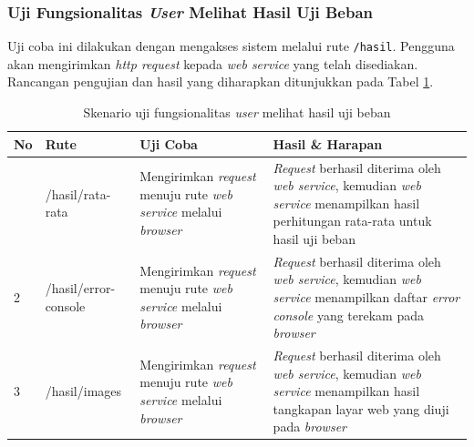 		\subsubsection{Uji Fungsionalitas \textit{User} Melihat Hasil Uji Beban}
			Uji coba ini dilakukan dengan mengakses sistem melalui rute \texttt{/hasil}. Pengguna akan mengirimkan \textit{http request} kepada \textit{web service} yang telah disediakan. Rancangan pengujian dan hasil yang diharapkan ditunjukkan pada Tabel \ref{tabelujihasil}.
			\begin{longtable}{|p{}|p{}|p{0.30\textwidth}|p{}|}
				\caption{Skenario uji fungsionalitas \textit{user} melihat hasil uji beban} \label{tabelujihasil} \\ \hline
				\textbf{No} & \textbf{Rute} & \textbf{Uji Coba} & \textbf{Hasil \& Harapan} \\ \hline
				\endhead
				\endfoot
				\endlastfoot
				1 & /hasil/rata-rata & Mengirimkan \textit{request} menuju rute \textit{web service} melalui \textit{browser} & \textit{Request} berhasil diterima oleh \textit{web service}, kemudian \textit{web service} menampilkan hasil perhitungan rata-rata untuk hasil uji beban \\ \hline
				2 & /hasil/error-console & Mengirimkan \textit{request} menuju rute \textit{web service} melalui \textit{browser} & \textit{Request} berhasil diterima oleh \textit{web service}, kemudian \textit{web service} menampilkan daftar \textit{error console} yang terekam pada \textit{browser} \\ \hline
				3 & /hasil/images & Mengirimkan \textit{request} menuju rute \textit{web service} melalui \textit{browser} & \textit{Request} berhasil diterima oleh \textit{web service}, kemudian \textit{web service} menampilkan hasil tangkapan layar web yang diuji pada \textit{browser} \\ \hline
			\end{longtable}
		
